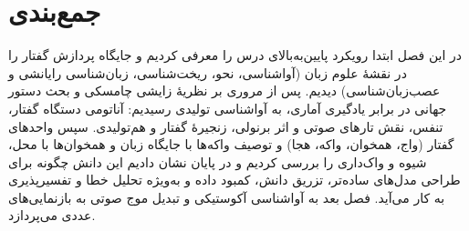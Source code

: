 \section{جمع‌بندی}
در این فصل ابتدا رویکرد پایین‌به‌بالای درس را معرفی کردیم و جایگاه پردازش گفتار را در نقشهٔ علوم زبان (آواشناسی، نحو، ریخت‌شناسی، زبان‌شناسی رایانشی و عصب‌زبان‌شناسی) دیدیم. پس از مروری بر نظریهٔ زایشی چامسکی و بحث دستور جهانی در برابر یادگیری آماری، به آواشناسی تولیدی رسیدیم: آناتومی دستگاه گفتار، تنفس، نقش تارهای صوتی و اثر برنولی، زنجیرهٔ گفتار و هم‌تولیدی. سپس واحدهای گفتار (واج، همخوان، واکه، هجا) و توصیف واکه‌ها با جایگاه زبان و همخوان‌ها با محل، شیوه و واک‌داری را بررسی کردیم و در پایان نشان دادیم این دانش چگونه برای طراحی مدل‌های ساده‌تر، تزریق دانش، کمبود داده و به‌ویژه تحلیل خطا و تفسیرپذیری به کار می‌آید. فصل بعد به آواشناسی آکوستیکی و تبدیل موج صوتی به بازنمایی‌های عددی می‌پردازد.

